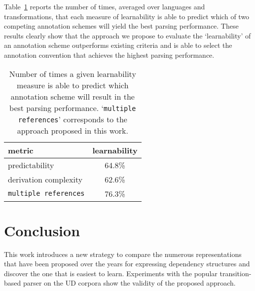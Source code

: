 \documentclass[11pt,letterpaper]{article}
\begin{document}

Table~\ref{tab:learnability} reports the number of times, averaged
over languages and transformations, that each measure of learnability
is able to predict which of two competing annotation schemes will
yield the best parsing performance. These results clearly show that the approach we propose to
evaluate the `learnability' of an annotation scheme outperforms
existing criteria
and is able to select the annotation convention that achieves the
highest parsing performance.

\begin{table}[h]
  \centering
  \begin{tabular}{lc}
    \toprule
    metric                & learnability \\
    \midrule
    predictability                 & 64.8\% \\
    derivation complexity          & 62.6\% \\
    \texttt{multiple references}   & 76.3\% \\
    \bottomrule
  \end{tabular}
  \caption{Number of times a given learnability measure is able to
    predict which annotation scheme will result in the best parsing
    performance. `\texttt{multiple references}' corresponds to the approach
    proposed in this work.\label{tab:learnability}}
\end{table}


\section{Conclusion}

This work introduces a new strategy to compare the numerous
representations that have been proposed over the years for expressing
dependency structures and discover the one that is easiest to learn.
Experiments with the popular transition-based parser on the UD corpora
show the validity of the proposed approach. 
\end{document}
